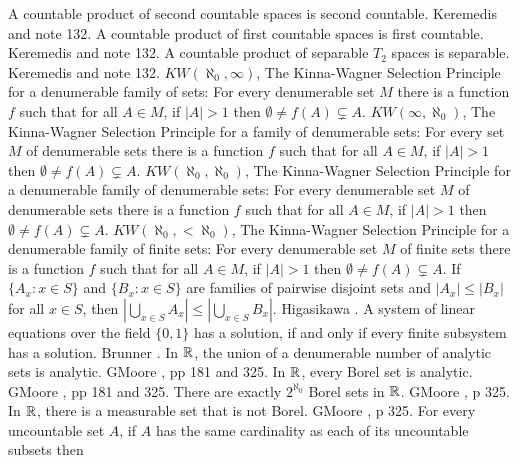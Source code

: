 \medskip
{} A countable product of second countable
spaces is second countable. \ac{Keremedis} \cite{1996b} and note 132.
\medskip
{} A countable product of first countable spaces
is first countable. \ac{Keremedis} \cite{1996b} and note 132.
\medskip
{} A countable product of separable $T_2$ spaces
is separable. \ac{Keremedis} \cite{1996b} and note 132.
\medskip
{} $KW(\aleph_0,\infty)$, The Kinna-Wagner Selection
Principle for a denumerable family of sets: For every denumerable set
$M$ there is a function $f$ such that for all $A\in M$, if $|A| > 1$
then $\emptyset\neq f(A)\subsetneq A$.
\medskip
{} $KW(\infty,\aleph_0)$, The Kinna-Wagner Selection
Principle for a family of denumerable sets: For every set $M$ of
denumerable sets there is a function $f$ such that for all $A\in M$,
if $|A| > 1$  then $\emptyset\neq f(A)\subsetneq A$.
\medskip
{} $KW(\aleph_0,\aleph_0)$, The Kinna-Wagner
Selection Principle for a denumerable family of denumerable sets: For
every denumerable set $M$ of denumerable sets there is a function $f$ such
that for all $A\in M$, if $|A| > 1$ then $\emptyset\neq f(A)\subsetneq A$.
\medskip
{} $KW(\aleph_0,<\aleph_0)$, The Kinna-Wagner
Selection Principle for a denumerable family of finite sets: For every
denumerable set $M$ of finite sets there is a function $f$ such that for
all $A\in M$, if $|A| > 1$ then $\emptyset\neq f(A)\subsetneq A$.
\medskip
{} If $\{A_{x}: x\in S\}$ and $\{B_{x}:
x\in S\}$ are families  of pairwise disjoint sets and $ |A_{x}|
\le |B_{x}|$ for all $x\in S$, then $|\bigcup_{x\in S}A_{x}|
\le |\bigcup_{x\in S} B_{x}|$. \ac{Higasikawa} \cite{1995}.
\medskip
{} A system of linear equations over the field
$\{0,1\}$ has a solution, if and only if every finite subsystem has
a solution. \ac{Brunner} \cite{1999}.
\medskip
{} In $\Bbb R$, the union of a denumerable
number of analytic sets is analytic.  G\. \ac{Moore} \cite{1982},
pp 181 and 325.
\medskip
{} In $\Bbb R$, every Borel set is analytic.
G\. \ac{Moore} \cite{1982}, pp 181 and 325.
\medskip
{} There are exactly $2^{\aleph_0}$ Borel sets
in $\Bbb R$.  G\. \ac{Moore} \cite{1982}, p 325.
\medskip
{} In $\Bbb R$, there is a measurable set
that is not Borel.  G\. \ac{Moore} \cite{1982}, p 325.
\medskip
{}  For every uncountable set $A$, if $A$ has the
same cardinality as each of its uncountable subsets then
